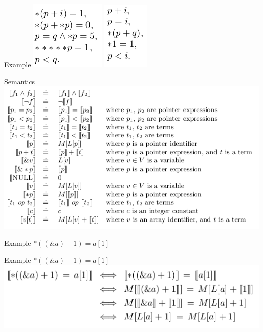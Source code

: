 \documentclass{beamer}
\begin{document}
\begin{frame}{Example}
\includegraphics[scale=0.5]{perm.png}
\includegraphics[scale=0.5]{not_perm.png}
\end{frame}

\begin{frame}{Semantics}
\includegraphics[scale=0.5]{semantics.png}
\end{frame}

\begin{frame}{Example}
$*((\&a) + 1) = a[1]$
\end{frame}

\begin{frame}{Example}
$*((\&a) + 1) = a[1]$
\includegraphics[scale=0.5]{semantics_ex.png}
\end{frame}
\end{document}
